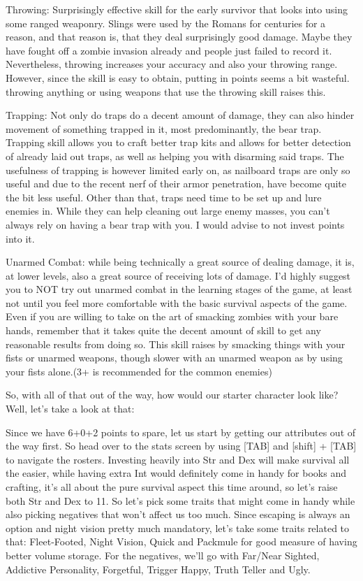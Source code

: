 \documentclass[11pt]{report}
\begin{document}
Throwing: Surprisingly effective skill for the early survivor that looks into using some ranged weaponry. Slings were used by the Romans for centuries for a reason, and that reason is, that they deal surprisingly good damage. Maybe they have fought off a zombie invasion already and people just failed to record it. Nevertheless, throwing increases your accuracy and also your throwing range. However, since the skill is easy to obtain, putting in points seems a bit wasteful. throwing anything or using weapons that use the throwing skill raises this.

Trapping: Not only do traps do a decent amount of damage, they can also hinder movement of something trapped in it, most predominantly, the bear trap. Trapping skill allows you to craft better trap kits and allows for better detection of already laid out traps, as well as helping you with disarming said traps. The usefulness of trapping is however limited early on, as nailboard traps are only so useful and due to the recent nerf of their armor penetration, have become quite the bit less useful. Other than that, traps need time to be set up and lure enemies in. While they can help cleaning out large enemy masses, you can't always rely on having a bear trap with you. I would advise to not invest points into it.

Unarmed Combat: while being technically a great source of dealing damage, it is, at lower levels, also a great source of receiving lots of damage. I'd highly suggest you to NOT try out unarmed combat in the learning stages of the game, at least not until you feel more comfortable with the basic survival aspects of the game. Even if you are willing to take on the art of smacking zombies with your bare hands, remember that it takes quite the decent amount of skill to get any reasonable results from doing so. This skill raises by smacking things with your fists or unarmed weapons, though slower with an unarmed weapon as by using your fists alone.(3+ is recommended for the common enemies)

So, with all of that out of the way, how would our starter character look like? Well, let's take a look at that:

Since we have 6+0+2 points to spare, let us start by getting our attributes out of the way first. So head over to the stats screen by using [TAB] and [shift] + [TAB] to navigate the rosters. Investing heavily into Str and Dex will make survival all the easier, while having extra Int would definitely come in handy for books and crafting, it's all about the pure survival aspect this time around, so let's raise both Str and Dex to 11. So let's pick some traits that might come in handy while also picking negatives that won't affect us too much. Since escaping is always an option and night vision pretty much mandatory, let's take some traits related to that: Fleet-Footed, Night Vision, Quick and Packmule for good measure of having better volume storage. For the negatives, we'll go with Far/Near Sighted, Addictive Personality, Forgetful, Trigger Happy, Truth Teller and Ugly.
\end{document}
